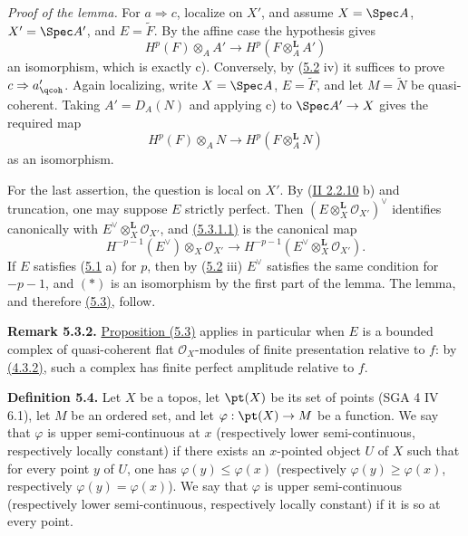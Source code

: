 \emph{Proof of the lemma.} For \(a\Rightarrow c\), localize on \(X'\), and assume \(X=\Spec A\), \(X'=\Spec A'\), and \(E=\widetilde F\). By the affine case the hypothesis gives
\[
 H^p(F)\otimes_AA'
 \longrightarrow
 H^p(F\otimes_A^{\mathbf L}A')
\]
an isomorphism, which is exactly c). Conversely, by (\hyperlink{sga6.e03.rem.5-2}{5.2} iv) it suffices to prove \(c\Rightarrow a'_{\qcoh}\). Again localizing, write \(X=\Spec A\), \(E=\widetilde F\), and let \(M=\widetilde N\) be quasi-coherent. Taking \(A'=D_A(N)\) and applying c) to \(\Spec A'\to X\) gives the required map
\[
 H^p(F)\otimes_AN
 \longrightarrow
 H^p(F\otimes_A^{\mathbf L}N)
\]
as an isomorphism.

For the last assertion, the question is local on \(X'\). By (\hyperlink{sga6.e02.rem.2-2-10}{II 2.2.10} b) and truncation, one may suppose \(E\) strictly perfect. Then \((E\otimes_X^{\mathbf L}\mathcal O_{X'})^{\vee}\) identifies canonically with \(E^{\vee}\otimes_X^{\mathbf L}\mathcal O_{X'}\), and \hyperlink{sga6.e03.eq.5-3-1-1}{(5.3.1.1)} is the canonical map
\[
 H^{-p-1}(E^{\vee})\otimes_X\mathcal O_{X'}
 \longrightarrow
 H^{-p-1}(E^{\vee}\otimes_X^{\mathbf L}\mathcal O_{X'}).
\tag{*}
\]
If \(E\) satisfies (\hyperlink{sga6.e03.lem.5-1}{5.1} a) for \(p\), then by (\hyperlink{sga6.e03.rem.5-2}{5.2} iii) \(E^{\vee}\) satisfies the same condition for \(-p-1\), and \((*)\) is an isomorphism by the first part of the lemma. The lemma, and therefore \hyperlink{sga6.e03.prop.5-3}{(5.3)}, follow.

\textbf{Remark 5.3.2.} \hyperlink{sga6.e03.prop.5-3}{Proposition (5.3)} applies in particular when \(E\) is a bounded complex of quasi-coherent flat \(\mathcal O_X\)-modules of finite presentation relative to \(f\): by \hyperlink{sga6.e03.cor.4-3-2}{(4.3.2)}, such a complex has finite perfect amplitude relative to \(f\).

\textbf{Definition 5.4.} Let \(X\) be a topos, let \(\pt(X)\) be its set of points (SGA 4 IV 6.1), let \(M\) be an ordered set, and let \(\varphi:\pt(X)\to M\) be a function. We say that \(\varphi\) is upper semi-continuous at \(x\) (respectively lower semi-continuous, respectively locally constant) if there exists an \(x\)-pointed object \(U\) of \(X\) such that for every point \(y\) of \(U\), one has \(\varphi(y)\leq\varphi(x)\) (respectively \(\varphi(y)\geq\varphi(x)\), respectively \(\varphi(y)=\varphi(x)\)). We say that \(\varphi\) is upper semi-continuous (respectively lower semi-continuous, respectively locally constant) if it is so at every point.

